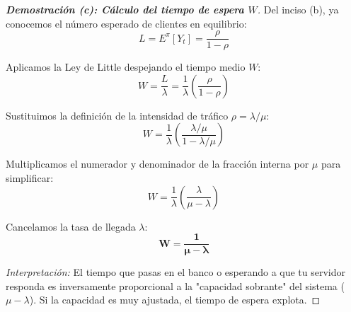 \documentclass[10pt,a4paper]{article}
\begin{document}
\vspace{5mm}

\begin{proof}[\textbf{Demostración (c): Cálculo del tiempo de espera $W$}]
    Del inciso (b), ya conocemos el número esperado de clientes en equilibrio:
    \[ L = E^\pi[Y_t] = \frac{\rho}{1-\rho} \]
    
    Aplicamos la Ley de Little despejando el tiempo medio $W$:
    \[ W = \frac{L}{\lambda} = \frac{1}{\lambda} \left( \frac{\rho}{1-\rho} \right) \]
    
    Sustituimos la definición de la intensidad de tráfico $\rho = \lambda/\mu$:
    \[ W = \frac{1}{\lambda} \left( \frac{\lambda/\mu}{1 - \lambda/\mu} \right) \]
    
    Multiplicamos el numerador y denominador de la fracción interna por $\mu$ para simplificar:
    \[ W = \frac{1}{\lambda} \left( \frac{\lambda}{\mu - \lambda} \right) \]
    
    Cancelamos la tasa de llegada $\lambda$:
    \[ \mathbf{W = \frac{1}{\mu - \lambda}} \]
    
    \textit{Interpretación:} El tiempo que pasas en el banco o esperando a que tu servidor responda es inversamente proporcional a la "capacidad sobrante" del sistema ($\mu - \lambda$). Si la capacidad es muy ajustada, el tiempo de espera explota.
\end{proof}

\vspace{5mm}
\end{document}
